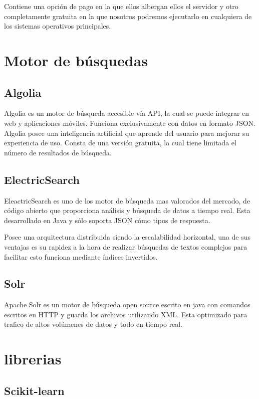 Contiene una opción de pago en la que ellos albergan ellos el servidor y otro completamente gratuita en la que nosotros podremos ejecutarlo en cualquiera de los sistemas operativos principales.

\section{Motor de búsquedas}

\subsection{Algolia}
Algolia es un motor de búsqueda accesible vía API, la cual se puede integrar en web y aplicaciones móviles. Funciona exclusivamente con datos en formato JSON. Algolia posee una inteligencia artificial que aprende del usuario para mejorar su experiencia de uso. Consta de una versión gratuita, la cual tiene limitada el número de resultados de búsqueda.

\subsection{ElectricSearch}
EleactricSearch es uno de los motor de búsqueda mas valorados del mercado, de código abierto que proporciona análisis y búsqueda de datos a tiempo real. Esta desarrollado en Java y sólo soporta JSON cómo tipos de respuesta.

Posee una arquitectura distribuida siendo la escalabilidad horizontal, una de sus ventajas es su rapidez a la hora de realizar búsquedas de textos complejos para facilitar esto funciona mediante índices invertidos.  



\subsection{Solr}
Apache Solr es un motor de búsqueda open source escrito en java con comandos escritos en HTTP y guarda los archivos utilizando XML. Esta optimizado para trafico de altos volúmenes de datos y todo en tiempo real. 

\section{librerias}

\subsection{Scikit-learn}

